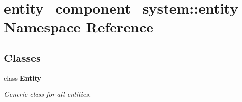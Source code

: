 \section{entity\+\_\+component\+\_\+system\+:\+:entity Namespace Reference}
\label{namespaceentity__component__system_1_1entity}
\subsection*{Classes}
\begin{DoxyCompactItemize}
\item 
class {\bf Entity}
\begin{DoxyCompactList}\small\item\em Generic class for all entities. \end{DoxyCompactList}\end{DoxyCompactItemize}
